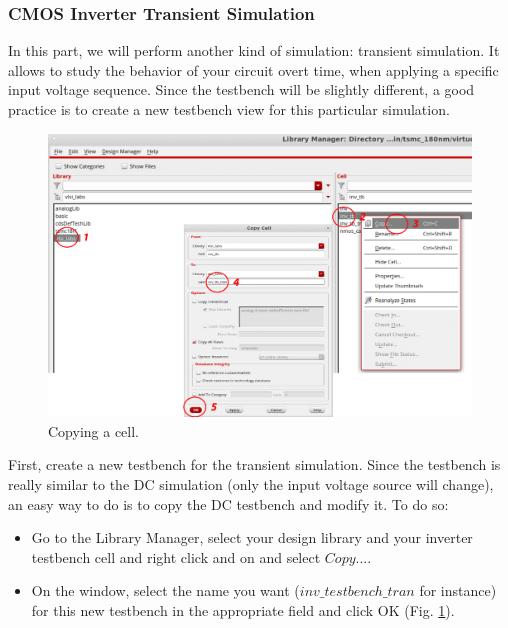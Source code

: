\subsubsection{CMOS Inverter Transient Simulation}	
In this part, we will perform another kind of simulation: transient simulation. It allows to study the behavior of your circuit overt time, when applying a specific input voltage sequence. Since the testbench will be slightly different, a good practice is to create a new testbench view for this particular simulation.
\begin{enumerate}
	
	\parbox[t]{\dimexpr\textwidth-\leftmargin}{%
		\begin{figure}
			\vspace{-0mm}
			\centering
			\vspace{-\baselineskip}
			\includegraphics[scale=0.35]{figures/lab1_schematic_sim/copy.pdf}
			\caption{Copying a cell.}
			\label{fig_copy}
		\end{figure}
		\item First, create a new testbench for the transient simulation. Since the testbench is really similar to the DC simulation (only the input voltage source will change), an easy way to do is to copy the DC testbench and modify it. To do so:
		\begin{itemize}
			\item Go to the Library Manager, select your design library and your inverter testbench cell and right click and on and select $Copy...$.
			\item On the window, select the name you want ($inv\_testbench\_tran$ for instance) for this new testbench in the appropriate field and click OK (Fig. \ref{fig_copy}).

\end{itemize}}
\end{enumerate}
